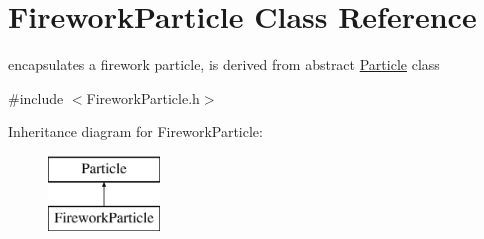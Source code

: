 \hypertarget{classFireworkParticle}{\section{Firework\-Particle Class Reference}
\label{classFireworkParticle}
}


encapsulates a firework particle, is derived from abstract \hyperlink{classParticle}{Particle} class  




{\ttfamily \#include $<$Firework\-Particle.\-h$>$}

Inheritance diagram for Firework\-Particle\-:\begin{figure}[H]
\begin{center}
\leavevmode
\includegraphics[height=2.000000cm]{classFireworkParticle}
\end{center}
\end{figure}
